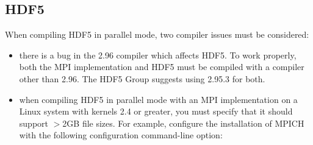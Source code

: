 %
%
% 
% 
% 
% 
%

\subsection{HDF5}
\label{app:hdf5-overview}



When compiling HDF5 in parallel mode, two compiler issues must be
considered:

\begin{itemize}
\item there is a bug in the  2.96 compiler which affects
  HDF5.  To work properly, both the MPI implementation and HDF5 must
  be compiled with a compiler other than 2.96. The HDF5 Group suggests
  using  2.95.3 for both.
  
\item when compiling HDF5 in parallel mode with an MPI implementation
  on a Linux system with kernels 2.4 or greater, you must specify that
  it should support $>$2GB file sizes.  For example, configure the
  installation of MPICH with the following configuration command-line
  option:

\end{itemize}

